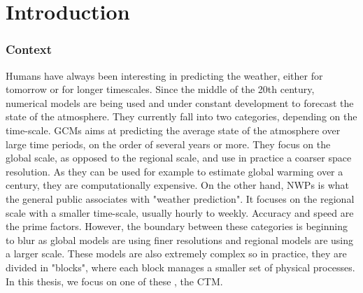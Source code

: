 

\chapter*[Introduction]{Introduction}

\subsection*{Context}
Humans have always been interesting in predicting the weather, either for
tomorrow or for longer timescales. Since the middle of the 20th century,
numerical models are being used and under constant development to forecast the
state of the atmosphere. They currently fall into two categories, depending on
the time-scale. \glspl{GCM} aims at predicting the average state of the atmosphere
over large time periods, on the order of several years or more. They focus on
the global scale, as opposed to the regional scale, and use in practice a
coarser space resolution. As they can be used for example to estimate global
warming over a century, they are computationally expensive. On the
other hand, \glspl{NWP} is what the general public associates with "weather
prediction". It focuses on the regional scale with a smaller time-scale,
usually hourly to weekly. Accuracy and speed are the prime factors.
However, the boundary between these categories is beginning to blur as global
models are using finer resolutions and regional models are using a larger scale.
These models are also extremely complex so in practice, they are divided in
"blocks", where each block manages a smaller set of physical processes. In this
thesis, we focus on one of these \DIFdelbegin {}\DIFdelend \DIFaddbegin {}\DIFaddend , the \gls{CTM}.

